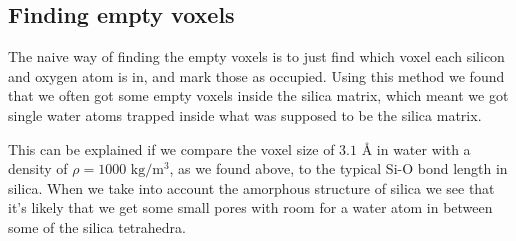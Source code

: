 \subsection{Finding empty voxels}
The naive way of finding the empty voxels is to just find which voxel each silicon and oxygen atom is in, and mark those as occupied. Using this method we found that we often got some empty voxels inside the silica matrix, which meant we got single water atoms trapped inside what was supposed to be the silica matrix. 

This can be explained if we compare the voxel size of $3.1 \text{ \AA}$ in water with a density of $\rho = 1000\text{ kg/m$^3$}$, as we found above, to the typical Si-O bond length in silica. When we take into account the amorphous structure of silica we see that it's likely that we get some small pores with room for a water atom in between some of the silica tetrahedra.

